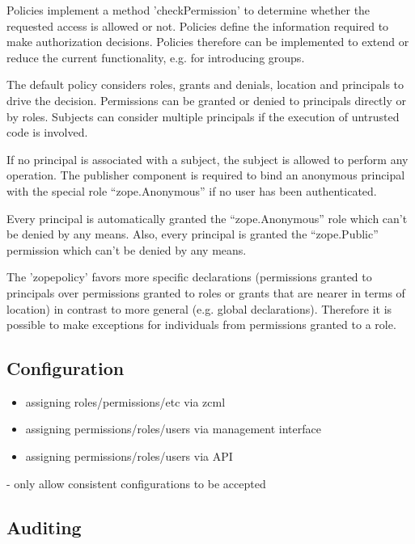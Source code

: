 \documentclass[12pt,english]{scrbook}
\begin{document}
Policies implement a method 'checkPermission' to determine whether the
requested access is allowed or not. Policies define the information required to
make authorization decisions.  Policies therefore can be implemented to extend
or reduce the current functionality, e.g. for introducing groups.

The default policy considers roles, grants and denials, location and principals
to drive the decision. Permissions can be granted or denied to principals
directly or by roles.  Subjects can consider multiple principals if the
execution of untrusted code is involved.

If no principal is associated with a subject, the subject is allowed to perform
any operation. The publisher component is required to bind an anonymous
principal with the special role ``zope.Anonymous'' if no user has been
authenticated.

Every principal is automatically granted the ``zope.Anonymous'' role which can't be
denied by any means. Also, every principal is granted the ``zope.Public''
permission which can't be denied by any means.

The 'zopepolicy' favors more specific declarations (permissions granted to
principals over permissions granted to roles or grants that are nearer in terms
of location) in contrast to more general (e.g. global declarations). Therefore
it is possible to make exceptions for individuals from permissions granted to a
role.




\subsection{Configuration}

\begin{itemize}
  \item assigning roles/permissions/etc via zcml
  \item assigning permissions/roles/users via management interface
  \item assigning permissions/roles/users via API
\end{itemize}

- only allow consistent configurations to be accepted

\subsection{Auditing}
\end{document}
